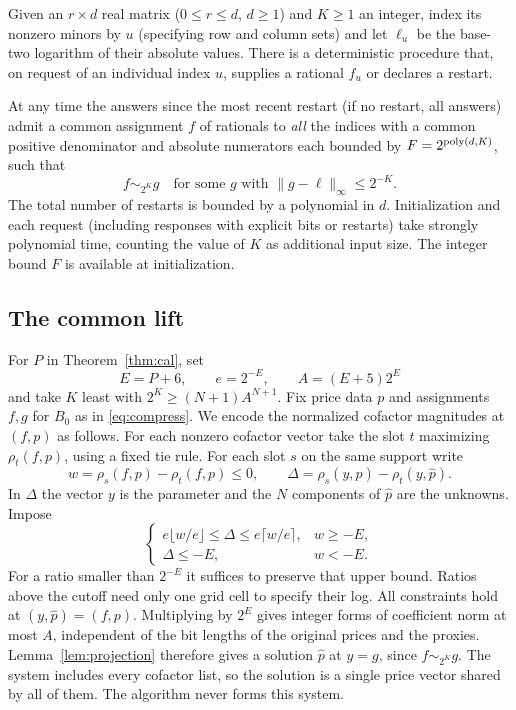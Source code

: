 \begin{theorem}\label{thm:compression}
Given an \(r\times d\) real matrix (\(0\le r\le d\), \(d\ge1\))
and \(K\ge1\) an integer,
index its nonzero minors by \(u\) (specifying row and column sets)
and let
\(\ell_u\) be the base-two logarithm of their absolute values.
There is a deterministic procedure that, on request of an
individual index \(u\), supplies a rational \(f_u\)
or declares a restart.

At any time the answers since the most recent restart (if no restart,
all answers) admit a common assignment \(f\) of rationals to
\emph{all} the indices with a common positive denominator and absolute
numerators each bounded by \(F=2^{\operatorname{poly}(d,K)}\), such that
\begin{equation}\label{eq:compress}
 f\sim_{2^K} g\quad\text{for some }g\text{ with }
 \|g-\ell\|_\infty\le2^{-K}.
\end{equation}
The total number of restarts is bounded by a polynomial in \(d\).
Initialization and each request (including responses with explicit
bits or restarts) take strongly polynomial time,
counting the value of \(K\) as additional input size. The integer bound \(F\)
is available at initialization.
\end{theorem}

\subsection{The common lift}

For \(P\) in Theorem~\ref{thm:cal}, set
\[
 E=P+6,\qquad e=2^{-E},\qquad A=(E+5)2^E
\]
and take \(K\) least with \(2^K\ge(N+1)A^{N+1}\).
Fix price data \(p\) and assignments \(f,g\) for \(B_0\) as in
\eqref{eq:compress}. We encode the normalized cofactor magnitudes at
\((f,p)\) as follows. For each nonzero cofactor vector take the slot
\(t\) maximizing \(\rho_t(f,p)\), using a fixed tie rule. For each
slot \(s\) on the same support write
\[
 w=\rho_s(f,p)-\rho_t(f,p)\le0,\qquad
 \Delta=\rho_s(y,\widehat p)-\rho_t(y,\widehat p).
\]
In \(\Delta\) the vector \(y\) is the parameter and the \(N\) components
of \(\widehat p\) are the unknowns. Impose
\[
 \begin{cases}
 e\lfloor w/e\rfloor\le\Delta\le e\lceil w/e\rceil,
      & w\ge-E,\\
 \Delta\le-E, & w<-E.
 \end{cases}
\]
For a ratio smaller than \(2^{-E}\) it suffices to preserve that upper
bound. Ratios above the cutoff need only one grid cell to specify
their log. All constraints hold at \((y,\widehat p)=(f,p)\).
Multiplying by \(2^E\) gives integer forms of coefficient norm at
most \(A\), independent of the bit lengths of the original prices
and the proxies. Lemma~\ref{lem:projection} therefore gives a solution
\(\widehat p\) at \(y=g\), since \(f\sim_{2^K}g\). The system
includes every cofactor list, so the solution is a single price vector
shared by all of them. The algorithm never forms this system.

